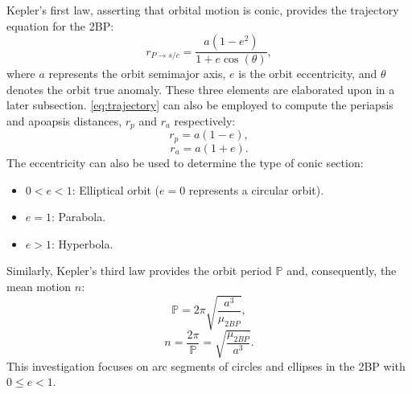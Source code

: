 Kepler's first law, asserting that orbital motion is conic, provides the trajectory equation for
the 2BP:
\begin{equation}
    r_{P\rightarrow s/c}=\frac{a(1-e^{2})}{1+e\cos(\theta)},
    \label{eq:trajectory}
\end{equation}
where $a$ represents the orbit semimajor axis, $e$ is the orbit eccentricity, and $\theta$ denotes
the orbit true anomaly. These three elements are elaborated upon in a later subsection.
\cref{eq:trajectory} can also be employed to compute the periapsis and apoapsis distances, $r_{p}$
and $r_{a}$ respectively:
\begin{equation}
    r_{p}=a(1-e),
    \label{eq:periapsis}
\end{equation}
\begin{equation}
    r_{a}=a(1+e).
    \label{eq:apoapsis}
\end{equation}
The eccentricity can also be used to determine the type of conic section:
\begin{itemize}
    \item   $0<e<1$: Elliptical orbit ($e=0$ represents a circular orbit).
    \item   $e=1$: Parabola.
    \item   $e>1$: Hyperbola.
\end{itemize}
Similarly, Kepler's third law provides the orbit period $\mathbb{P}$ and, consequently, the mean
motion $n$:
\begin{equation}
    \mathbb{P}=2\pi\sqrt{\frac{a^{3}}{\mu_{2BP}}},
    \label{eq:period}
\end{equation}
\begin{equation}
    n=\frac{2\pi}{\mathbb{P}}=\sqrt{\frac{\mu_{2BP}}{a^{3}}}.
    \label{eq:meanmotion}
\end{equation}
This investigation focuses on arc segments of circles and ellipses in the 2BP with $0\leq e<1$. 

